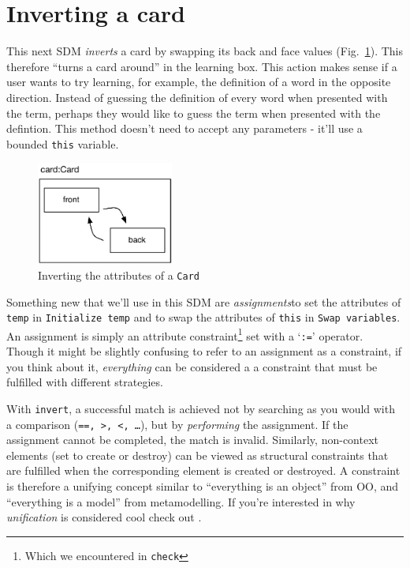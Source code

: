 \newpage
\section{Inverting a card}
\genHeader
\hypertarget{sec:invertCard}{}

This next SDM \emph{inverts} a card by swapping its back and face values (Fig.~\ref{fig:goal_invert}). This therefore ``turns a card around'' in the learning
box. This action makes sense if a user wants to try learning, for example, the definition of a word in the opposite direction. Instead of guessing the
definition of every word when presented with the term, perhaps they would like to guess the term when presented with the defintion. This method doesn't need to
accept any parameters - it'll use a bounded \texttt{this} variable.

\vspace{0.5cm}

\begin{figure}[htbp]
	\centering
    \includegraphics[width=0.4\textwidth]{goal_invert.pdf}
 	\caption{Inverting the attributes of a \texttt{Card}}
 	\label{fig:goal_invert}
\end{figure}
\FloatBarrier

Something new that we'll use in this SDM are \emph{assignments}to set the attributes of \texttt{temp} in \texttt{Initialize temp} and to
swap the attributes of \texttt{this} in \texttt{Swap variables}. An assignment is simply an attribute constraint\footnote{Which we encountered in
\texttt{check}} set with a `\texttt{:=}' operator. Though it might be slightly confusing to refer to an assignment as a constraint, if you think about it,
\emph{everything} can be considered a a constraint that must be fulfilled with different strategies. 

With \texttt{invert}, a successful match is achieved not by searching as you would with a comparison (\texttt{==, >, <, \ldots}), but by \emph{performing} the
assignment. If the assignment cannot be completed, the match is invalid. Similarly, non-context elements (set to create or destroy) can be viewed as structural
constraints that are fulfilled when the corresponding element is created or destroyed.  A constraint is therefore a unifying concept similar to ``everything is
an object'' from OO, and ``everything is a model'' from metamodelling.  If you're interested in why \emph{unification} is considered cool check out \cite{BEZ05}.








